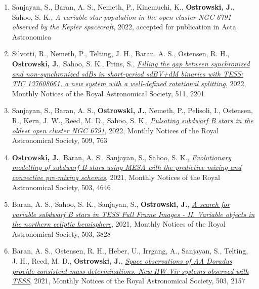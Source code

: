 \documentclass[margin, 10pt]{res} %
\begin{document}
\begin{resume}
\begin{enumerate}
    \item Sanjayan, S., Baran, A. S., Nemeth, P., Kinemuchi, K., \textbf{Ostrowski, J.}, Sahoo, S. K., \textit{A variable star population in the open cluster NGC 6791 observed by the Kepler spacecraft}, 2022, accepted for publication in Acta Astronomica

    \item Silvotti, R., Nemeth, P., Telting, J. H., Baran, A. S., Ostensen, R. H., \textbf{Ostrowski, J.}, Sahoo, S. K., Prins, S., \href{https://ui.adsabs.harvard.edu/abs/2022MNRAS.511.2201S/abstract}{\textit{Filling the gap between synchronized and non-synchronized sdBs in short-period sdBV+dM binaries with TESS: TIC 137608661, a new system with a well-defined rotational splitting}}, 2022, Monthly Notices of the Royal Astronomical Society, 511, 2201

    \item Sanjayan, S., Baran, A. S., \textbf{Ostrowski, J.}, Nemeth, P., Pelisoli, I., Ostensen, R., Kern, J. W., Reed, M. D., Sahoo, S. K., \href{https://ui.adsabs.harvard.edu/abs/2022MNRAS.509..763S/abstract}{\textit{Pulsating subdwarf B stars in the oldest open cluster NGC 6791}}, 2022, Monthly Notices of the Royal Astronomical Society, 509, 763

    \item \textbf{Ostrowski, J.}, Baran, A. S., Sanjayan, S., Sahoo, S. K., \href{https://ui.adsabs.harvard.edu/abs/2021MNRAS.503.4646O/abstract}{\textit{Evolutionary modelling of subdwarf B stars using MESA with the predictive mixing and convective pre-mixing schemes}}, 2021, Monthly Notices of the Royal Astronomical Society, 503, 4646

    \item Baran, A. S., Sahoo, S. K., Sanjayan, S., \textbf{Ostrowski, J.}, \href{https://ui.adsabs.harvard.edu/abs/2021MNRAS.503.3828B/abstract}{\textit{A search for variable subdwarf B stars in TESS Full Frame Images - II. Variable objects in the northern ecliptic hemisphere}}, 2021, Monthly Notices of the Royal Astronomical Society, 503, 3828

    \item Baran, A. S., Ostensen, R. H., Heber, U., Irrgang, A., Sanjayan, S., Telting, J. H., Reed, M. D., \textbf{Ostrowski, J.}, \href{https://ui.adsabs.harvard.edu/abs/2021MNRAS.503.2157B/abstract}{\textit{Space observations of AA Doradus provide consistent mass determinations. New HW-Vir systems observed with TESS}}, 2021, Monthly Notices of the Royal Astronomical Society, 503, 2157


\end{enumerate}
\end{resume}
\end{document}
